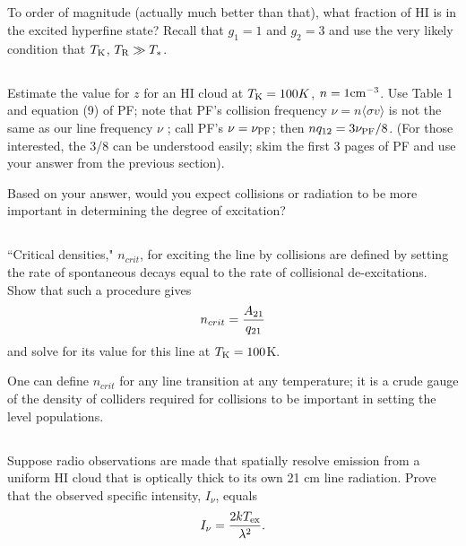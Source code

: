 \documentclass[11pt]{article}
\begin{document}
\subsection{} To order of magnitude (actually much better than that), what
fraction of HI is in the excited hyperfine state? Recall that $g_1 = 1$ and $g_2 = 3$
and use the very likely condition that ${T_{\rm K}}$, ${T_{\rm R}}\gg T_*$.

\def\nuPF{{\nu_{\rm PF}}}
\subsection{} Estimate the value for $z$ for an HI cloud at ${T_{\rm K}} = 100K$, $n =
1 {\rm cm}^{-3}$. Use Table 1 and equation (9) of PF; note that PF's collision
frequency $\nu=n\langle\sigma v\rangle$ is not the same as our line frequency $\nu$ ; 
call PF's $\nu=\nuPF$; then $n\qot=3\nuPF/8$.  (For those interested, the 3/8 can be understood
easily; skim the first 3 pages of PF and use your answer from the previous section). 

Based on your answer, would you expect collisions or radiation to be more
important in determining the degree of excitation?

\def\ncrit{{n_{crit}}}
\subsection{} ``Critical densities," $\ncrit$, for exciting the line by collisions are 
defined by setting the rate of spontaneous decays equal to the rate of collisional 
de-excitations. Show that such a procedure gives
\begin{equation}
\ncrit=\frac{\Ato}{\qto}
\end{equation}
and solve for its value for this line at ${T_{\rm K}} = 100$K.

One can define $\ncrit$ for any line transition at any temperature; it is a
crude gauge of the density of colliders required for collisions to be important
in setting the level populations.

\subsection{} Suppose radio observations are made that spatially resolve
emission from a uniform HI cloud that is optically thick to its own 21 cm line
radiation. Prove that the observed specific intensity, $I_\nu$, equals 
\begin{equation}
I_\nu=\frac{2k{T_{\rm ex}}}{\lambda^2}.
\end{equation}
\end{document}
